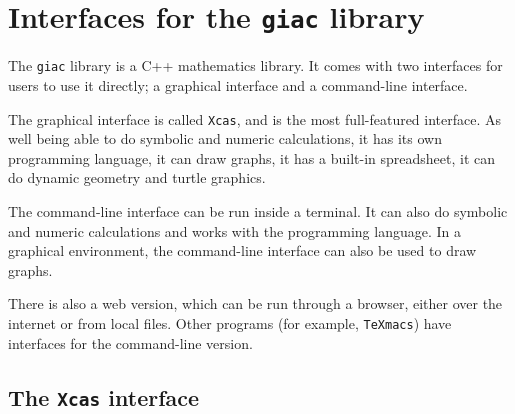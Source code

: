 \documentclass[a4paper,11pt]{book}
\begin{document}
\section{Interfaces for the \texttt{giac} library}

The \texttt{giac} library is a C++ mathematics library.  
It comes with two interfaces for users to use it directly; a graphical
interface and a command-line interface.

The graphical interface is called \texttt{Xcas}, and is the most
full-featured interface.  As well being able to do symbolic and numeric
calculations, it has its own programming language, it can draw graphs,
it has a built-in spreadsheet, it can do dynamic geometry
and turtle graphics.

The command-line interface can be run inside a terminal.  It can also
do symbolic and numeric calculations and works with the programming
language.  In a graphical environment, the command-line interface can
also be used to draw graphs.

There is also a web version, which can be run through a browser,
either over the internet or from local files.  Other programs (for
example, \texttt{TeXmacs}) have interfaces for the command-line
version.

\subsection{The \texttt{Xcas} interface}
\end{document}
